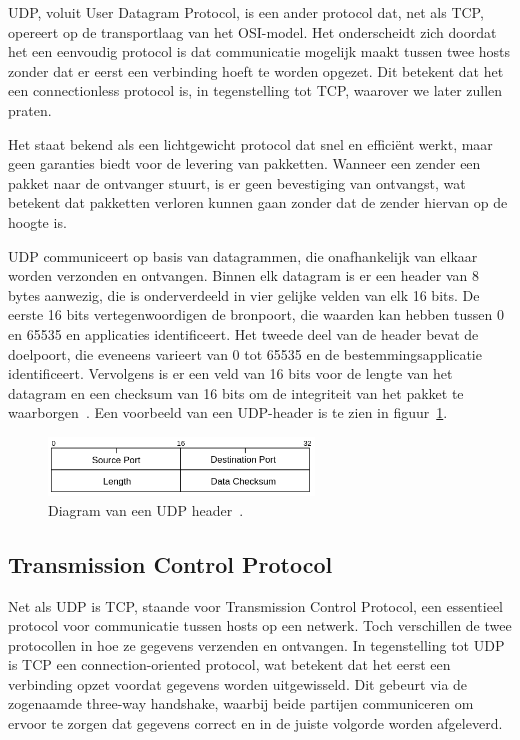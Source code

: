 UDP, voluit User Datagram Protocol, is een ander protocol dat, net als TCP, opereert op de transportlaag van het OSI-model.
Het onderscheidt zich doordat het een eenvoudig protocol is dat communicatie mogelijk maakt tussen twee hosts zonder dat er eerst een verbinding hoeft te worden opgezet.
Dit betekent dat het een connectionless protocol is, in tegenstelling tot TCP, waarover we later zullen praten.

Het staat bekend als een lichtgewicht protocol dat snel en effici\"ent werkt, maar geen garanties biedt voor de levering van pakketten.
Wanneer een zender een pakket naar de ontvanger stuurt, is er geen bevestiging van ontvangst, wat betekent dat pakketten verloren kunnen gaan zonder dat de zender hiervan op de hoogte is.

UDP communiceert op basis van datagrammen, die onafhankelijk van elkaar worden verzonden en ontvangen.
Binnen elk datagram is er een header van 8 bytes aanwezig, die is onderverdeeld in vier gelijke velden van elk 16 bits.
De eerste 16 bits vertegenwoordigen de bronpoort, die waarden kan hebben tussen 0 en 65535 en applicaties identificeert.
Het tweede deel van de header bevat de doelpoort, die eveneens varieert van 0 tot 65535 en de bestemmingsapplicatie identificeert.
Vervolgens is er een veld van 16 bits voor de lengte van het datagram en een checksum van 16 bits om de integriteit van het pakket te waarborgen~\autocite{dordal2020}.
Een voorbeeld van een UDP-header is te zien in figuur~\ref{fig:netwerk-udp-header}.

\begin{figure}[h!]
    \begin{center}
        \includegraphics[width=200pt]
        {./graphics/network/udp-header.png}
        \caption[UDP header diagram.]{\label{fig:netwerk-udp-header}Diagram van een UDP header~\autocite{dordal2020}.}
    \end{center}
\end{figure}

\subsection{Transmission Control Protocol}
\label{netwerk_tcp}

Net als UDP is TCP, staande voor Transmission Control Protocol, een essentieel protocol voor communicatie tussen hosts op een netwerk.
Toch verschillen de twee protocollen in hoe ze gegevens verzenden en ontvangen.
In tegenstelling tot UDP is TCP een connection-oriented protocol, wat betekent dat het eerst een verbinding opzet voordat gegevens worden uitgewisseld.
Dit gebeurt via de zogenaamde three-way handshake, waarbij beide partijen communiceren om ervoor te zorgen dat gegevens correct en in de juiste volgorde worden afgeleverd.

